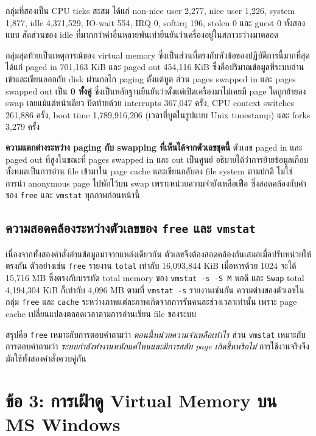 \documentclass[a4paper,11pt]{article}
\newcommand{\code}[1]{\texttt{#1}}
\begin{document}
กลุ่มที่สองเป็น CPU ticks สะสม ได้แก่ non-nice user 2{,}277, nice user 1{,}226, system 1{,}877, idle 4{,}371{,}529, IO-wait 554, IRQ 0, softirq 196, stolen 0 และ guest 0 ทั้งสองแบบ สัดส่วนของ idle ที่มากกว่าค่าอื่นหลายพันเท่ายืนยันว่าเครื่องอยู่ในสภาวะว่างมาตลอด

กลุ่มสุดท้ายเป็นเหตุการณ์ของ virtual memory ซึ่งเป็นส่วนที่ตรงกับหัวข้อของปฏิบัติการนี้มากที่สุด ได้แก่ paged in 701{,}163 KiB และ paged out 454{,}116 KiB ซึ่งคือปริมาณข้อมูลที่ระบบอ่านเข้าและเขียนออกกับ disk ผ่านกลไก paging ตั้งแต่บูต ส่วน pages swapped in และ pages swapped out เป็น \textbf{0 ทั้งคู่} ซึ่งเป็นหลักฐานยืนยันว่าตั้งแต่เปิดเครื่องมาไม่เคยมี page ใดถูกย้ายลง swap เลยแม้แต่หน้าเดียว ปิดท้ายด้วย interrupts 367{,}047 ครั้ง, CPU context switches 261{,}886 ครั้ง, boot time 1{,}789{,}916{,}206 (เวลาที่บูตในรูปแบบ Unix timestamp) และ forks 3{,}279 ครั้ง

\textbf{ความแตกต่างระหว่าง paging กับ swapping ที่เห็นได้จากตัวเลขชุดนี้} ตัวเลข paged in และ paged out ที่สูงในขณะที่ pages swapped in และ out เป็นศูนย์ อธิบายได้ว่าการย้ายข้อมูลเกือบทั้งหมดเป็นการอ่าน file เข้ามาใน page cache และเขียนกลับลง file system ตามปกติ ไม่ใช่การนำ anonymous page ไปพักไว้บน swap เพราะหน่วยความจำยังเหลือเฟือ ซึ่งสอดคล้องกับค่าของ \code{free} และ \code{vmstat} ทุกภาพก่อนหน้านี้

\subsection{ความสอดคล้องระหว่างตัวเลขของ \code{free} และ \code{vmstat}}

เนื่องจากทั้งสองคำสั่งอ่านข้อมูลมาจากแหล่งเดียวกัน ตัวเลขจึงต้องสอดคล้องกันเสมอเมื่อปรับหน่วยให้ตรงกัน ตัวอย่างเช่น \code{free} รายงาน \code{total} เท่ากับ 16{,}093{,}844 KiB เมื่อหารด้วย 1024 จะได้ 15{,}716 MB ซึ่งตรงกับบรรทัด total memory ของ \code{vmstat -s -S M} พอดี และ \code{Swap} total 4{,}194{,}304 KiB ก็เท่ากับ 4{,}096 MB ตามที่ \code{vmstat -s} รายงานเช่นกัน ความต่างของตัวเลขในกลุ่ม \code{free} และ \code{cache} ระหว่างภาพแต่ละภาพเกิดจากการรันคนละช่วงเวลาเท่านั้น เพราะ page cache เปลี่ยนแปลงตลอดเวลาตามการอ่านเขียน file ของระบบ

สรุปคือ \code{free} เหมาะกับการตอบคำถามว่า \textit{ตอนนี้หน่วยความจำเหลือเท่าไร} ส่วน \code{vmstat} เหมาะกับการตอบคำถามว่า \textit{ระบบกำลังทำงานหนักแค่ไหนและมีการสลับ page เกิดขึ้นหรือไม่} การใช้งานจริงจึงมักใช้ทั้งสองคำสั่งควบคู่กัน

\section{ข้อ 3: การเฝ้าดู Virtual Memory บน MS Windows}
\end{document}
